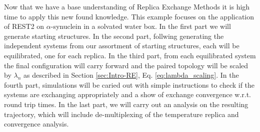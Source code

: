Now that we have a base understanding of Replica Exchange Methods it is high time to apply this new found knowledge. 
This example focuses on the application of REST2 on $\alpha$-synuclein in a solvated water box.
In the first part we will generate starting structures. In the second part, follwing generating the independent systems from our assortment of starting structures, each will be equilibrated, one for each replica. 
In the third part, from each equilibrated system the final configuration will carry forward and the paired topology will be scaled by $\lambda_n$ as described in Section \ref{sec:Intro-RE}, Eq. \ref{eq:lambda_scaling}. In the fourth part, simulations will be caried out with simple instructions to check if the systems are exchanging appropriately and a show of exchange convergence w.r.t. round trip times. In the last part, we will carry out an analysis on the resulting trajectory, which will include de-multiplexing of the temperature replica and convergence analysis. 